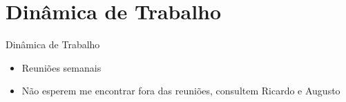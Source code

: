 \section{Dinâmica de Trabalho}

\begin{frame}{Dinâmica de Trabalho}

\begin{itemize}[<+-|alert@+>]\color{gray}
    \item Reuniões semanais
    \item Não esperem me encontrar fora das reuniões, consultem Ricardo e Augusto
\end{itemize}

\end{frame}
